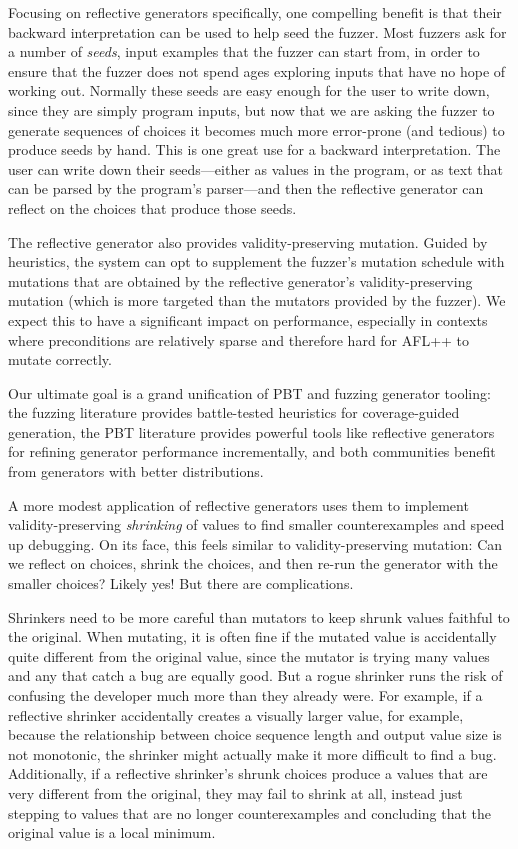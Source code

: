 Focusing on reflective generators specifically, one compelling benefit is that
their backward interpretation can be used to help seed the fuzzer.  Most fuzzers
ask for a number of {\em seeds}, input examples that the fuzzer can start from,
in order to ensure that the fuzzer does not spend ages exploring
inputs that have no hope of working out. Normally these seeds are easy enough
for the user to write down, since they are simply program inputs, but now that
we are asking the fuzzer to generate sequences of choices it becomes much more
error-prone (and tedious) to produce seeds by hand.  This is one great use for a
backward interpretation. The user can write down their seeds---either as values
in the program, or as text that can be parsed by the program's parser---and then
the reflective generator can reflect on the choices that produce those seeds.

The reflective generator also provides validity-preserving mutation. Guided by
heuristics, the system can opt to supplement the fuzzer's mutation schedule with
mutations that are obtained by the reflective generator's validity-preserving
mutation (which is more targeted than the mutators provided by the fuzzer). We
expect this to have a significant impact on performance, especially in contexts
where preconditions are relatively sparse and therefore hard for AFL++ to mutate
correctly.

Our ultimate goal is a grand unification of PBT and fuzzing generator tooling:
the fuzzing literature provides battle-tested heuristics for coverage-guided
generation, the PBT literature provides powerful tools like reflective
generators for refining generator performance incrementally, and both
communities benefit from generators with better distributions.


A more modest application of reflective generators uses them to implement
validity-preserving {\em shrinking} of values to find smaller counterexamples
and speed up debugging. On its face, this feels similar to validity-preserving
mutation: Can we reflect on choices, shrink the choices, and then re-run the
generator with the smaller choices? Likely yes! But there are complications.

Shrinkers need to be more careful than mutators to keep shrunk values faithful
to the original. When mutating, it is often fine if the mutated value is
accidentally quite different from the original value, since the mutator is
trying many values and any that catch a bug are equally good. But a rogue
shrinker runs the risk of confusing the developer much more than they already
were. For example, if a reflective shrinker accidentally creates a visually larger
value, for example, because the relationship between choice sequence length and
output value size is not monotonic, the shrinker might actually make it more
difficult to find a bug. Additionally, if a reflective shrinker's shrunk choices
produce a values that are very different from the original, they may fail to
shrink at all, instead just stepping to values that are no longer
counterexamples and concluding that the original value is a local minimum.

